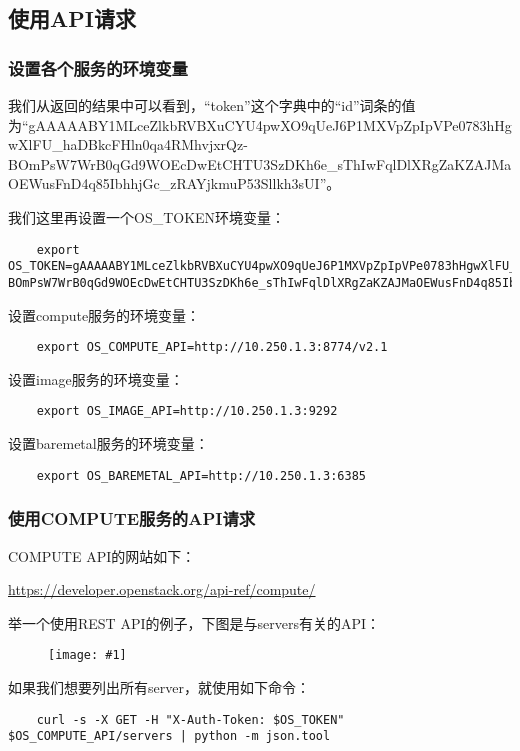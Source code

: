 \documentclass[a4paper,left=1.5cm,right=1.5cm,11pt]{article}
\newcommand{\fic}[1]{\begin{figure}[H]
		\center
		\texttt{[image: \#1]}
	\end{figure}}
\begin{document}
\subsection{使用API请求}
\subsubsection{设置各个服务的环境变量}
	我们从返回的结果中可以看到，“token”这个字典中的“id”词条的值为“gAAAAABY1MLceZlkbRVBXuCYU4pwXO9qUeJ6P1MXVpZpIpVPe0783hHgwXlFU_haDBkcFHln0qa4RMhvjxrQz-BOmPsW7WrB0qGd9WOEcDwEtCHTU3SzDKh6e_sThIwFqlDlXRgZaKZAJMaOEWusFnD4q85IbhhjGc_zRAYjkmuP53Sllkh3sUI”。\par

	我们这里再设置一个OS\_TOKEN环境变量：
	\begin{lstlisting}
	export OS_TOKEN=gAAAAABY1MLceZlkbRVBXuCYU4pwXO9qUeJ6P1MXVpZpIpVPe0783hHgwXlFU_haDBkcFHln0qa4RMhvjxrQz-BOmPsW7WrB0qGd9WOEcDwEtCHTU3SzDKh6e_sThIwFqlDlXRgZaKZAJMaOEWusFnD4q85IbhhjGc_zRAYjkmuP53Sllkh3sUI
	\end{lstlisting}

	设置compute服务的环境变量：
	\begin{lstlisting}
	export OS_COMPUTE_API=http://10.250.1.3:8774/v2.1
	\end{lstlisting}

	设置image服务的环境变量：
	\begin{lstlisting}
	export OS_IMAGE_API=http://10.250.1.3:9292
	\end{lstlisting}

	设置baremetal服务的环境变量：
	\begin{lstlisting}
	export OS_BAREMETAL_API=http://10.250.1.3:6385
	\end{lstlisting}

\subsubsection{使用COMPUTE服务的API请求}
	COMPUTE API的网站如下：\par
	\url{https://developer.openstack.org/api-ref/compute/}\par

	举一个使用REST API的例子，下图是与servers有关的API：
	\fic{1.png}

	如果我们想要列出所有server，就使用如下命令：
	\begin{lstlisting}
	curl -s -X GET -H "X-Auth-Token: $OS_TOKEN" $OS_COMPUTE_API/servers | python -m json.tool
	\end{lstlisting}
\end{document}
